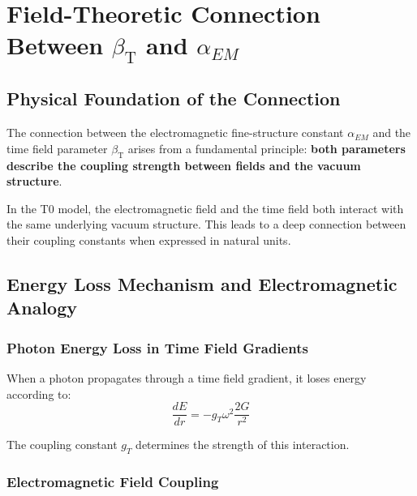 \documentclass[12pt,a4paper]{article}
\newcommand{\betaT}{\beta_{\text{T}}}
\begin{document}
	\section{Field-Theoretic Connection Between $\betaT$ and $\alpha_{EM}$}
	\label{sec:beta_alpha_connection}
	
	\subsection{Physical Foundation of the Connection}
	\label{subsec:physical_foundation}
	
	The connection between the electromagnetic fine-structure constant $\alpha_{EM}$ and the time field parameter $\betaT$ arises from a fundamental principle: \textbf{both parameters describe the coupling strength between fields and the vacuum structure}.
	
	\begin{tcolorbox}[colback=blue!5!white,colframe=blue!75!black,title=Fundamental Insight]
		In the T0 model, the electromagnetic field and the time field both interact with the same underlying vacuum structure. This leads to a deep connection between their coupling constants when expressed in natural units.
	\end{tcolorbox}
	
	\subsection{Energy Loss Mechanism and Electromagnetic Analogy}
	\label{subsec:energy_loss_mechanism}
	
	\subsubsection{Photon Energy Loss in Time Field Gradients}
	\label{subsubsec:photon_energy_loss}
	
	When a photon propagates through a time field gradient, it loses energy according to:
	\begin{equation}
		\frac{dE}{dr} = -g_T \omega^2 \frac{2G}{r^2}
	\end{equation}
	
	The coupling constant $g_T$ determines the strength of this interaction.
	
	\subsubsection{Electromagnetic Field Coupling}
	\label{subsubsec:em_field_coupling}
	
\end{document}
